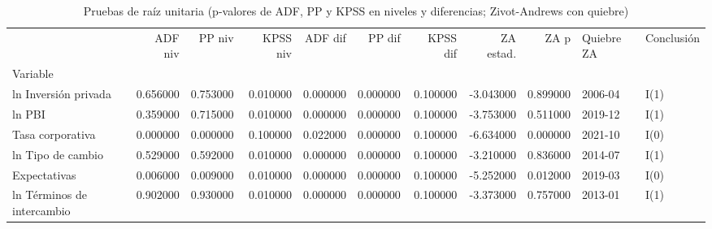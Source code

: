 \begin{table}
\caption{Pruebas de raíz unitaria (p-valores de ADF, PP y KPSS en niveles y diferencias; Zivot-Andrews con quiebre)}
\label{tab:tabla4_raiz_unitaria}
\begin{tabular}{lrrrrrrrrll}
\toprule
 & ADF niv & PP niv & KPSS niv & ADF dif & PP dif & KPSS dif & ZA estad. & ZA p & Quiebre ZA & Conclusión \\
Variable &  &  &  &  &  &  &  &  &  &  \\
\midrule
ln Inversión privada & 0.656000 & 0.753000 & 0.010000 & 0.000000 & 0.000000 & 0.100000 & -3.043000 & 0.899000 & 2006-04 & I(1) \\
ln PBI & 0.359000 & 0.715000 & 0.010000 & 0.000000 & 0.000000 & 0.100000 & -3.753000 & 0.511000 & 2019-12 & I(1) \\
Tasa corporativa & 0.000000 & 0.000000 & 0.100000 & 0.022000 & 0.000000 & 0.100000 & -6.634000 & 0.000000 & 2021-10 & I(0) \\
ln Tipo de cambio & 0.529000 & 0.592000 & 0.010000 & 0.000000 & 0.000000 & 0.100000 & -3.210000 & 0.836000 & 2014-07 & I(1) \\
Expectativas & 0.006000 & 0.009000 & 0.010000 & 0.000000 & 0.000000 & 0.100000 & -5.252000 & 0.012000 & 2019-03 & I(0) \\
ln Términos de intercambio & 0.902000 & 0.930000 & 0.010000 & 0.000000 & 0.000000 & 0.100000 & -3.373000 & 0.757000 & 2013-01 & I(1) \\
\bottomrule
\end{tabular}
\end{table}
